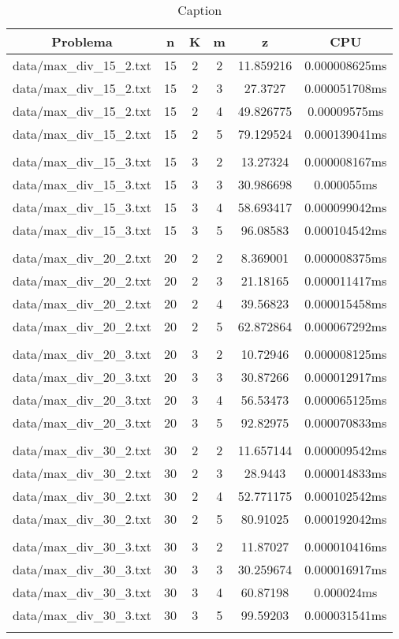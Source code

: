 \begin{table}[h]
\centering
\begin{tabular}{|c|c|c|c|c|c|}
\hline
Problema &  n &  K &  m &  z &  CPU \\
\hline
data/max\_div\_15\_2.txt &  15 &  2 &  2 &  11.859216 &  0.000008625ms \\
data/max\_div\_15\_2.txt &  15 &  2 &  3 &  27.3727 &  0.000051708ms \\
data/max\_div\_15\_2.txt &  15 &  2 &  4 &  49.826775 &  0.00009575ms \\
data/max\_div\_15\_2.txt &  15 &  2 &  5 &  79.129524 &  0.000139041ms \\
 \\
data/max\_div\_15\_3.txt &  15 &  3 &  2 &  13.27324 &  0.000008167ms \\
data/max\_div\_15\_3.txt &  15 &  3 &  3 &  30.986698 &  0.000055ms \\
data/max\_div\_15\_3.txt &  15 &  3 &  4 &  58.693417 &  0.000099042ms \\
data/max\_div\_15\_3.txt &  15 &  3 &  5 &  96.08583 &  0.000104542ms \\
 \\
data/max\_div\_20\_2.txt &  20 &  2 &  2 &  8.369001 &  0.000008375ms \\
data/max\_div\_20\_2.txt &  20 &  2 &  3 &  21.18165 &  0.000011417ms \\
data/max\_div\_20\_2.txt &  20 &  2 &  4 &  39.56823 &  0.000015458ms \\
data/max\_div\_20\_2.txt &  20 &  2 &  5 &  62.872864 &  0.000067292ms \\
 \\
data/max\_div\_20\_3.txt &  20 &  3 &  2 &  10.72946 &  0.000008125ms \\
data/max\_div\_20\_3.txt &  20 &  3 &  3 &  30.87266 &  0.000012917ms \\
data/max\_div\_20\_3.txt &  20 &  3 &  4 &  56.53473 &  0.000065125ms \\
data/max\_div\_20\_3.txt &  20 &  3 &  5 &  92.82975 &  0.000070833ms \\
 \\
data/max\_div\_30\_2.txt &  30 &  2 &  2 &  11.657144 &  0.000009542ms \\
data/max\_div\_30\_2.txt &  30 &  2 &  3 &  28.9443 &  0.000014833ms \\
data/max\_div\_30\_2.txt &  30 &  2 &  4 &  52.771175 &  0.000102542ms \\
data/max\_div\_30\_2.txt &  30 &  2 &  5 &  80.91025 &  0.000192042ms \\
 \\
data/max\_div\_30\_3.txt &  30 &  3 &  2 &  11.87027 &  0.000010416ms \\
data/max\_div\_30\_3.txt &  30 &  3 &  3 &  30.259674 &  0.000016917ms \\
data/max\_div\_30\_3.txt &  30 &  3 &  4 &  60.87198 &  0.000024ms \\
data/max\_div\_30\_3.txt &  30 &  3 &  5 &  99.59203 &  0.000031541ms \\
 \\
\hline
\end{tabular}
\caption{Caption}
\label{tab:my_table}
\end{table}
